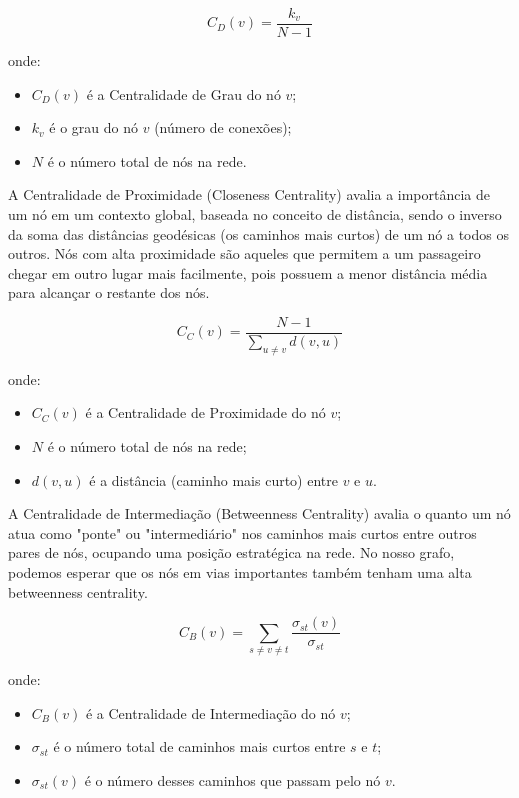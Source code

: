 \begin{equation*}
C_D(v) = \frac{k_v}{N - 1}
\end{equation*}

onde:
\begin{itemize}
    \item $C_D(v)$ é a Centralidade de Grau do nó $v$;
    \item $k_v$ é o grau do nó $v$ (número de conexões);
    \item $N$ é o número total de nós na rede.
\end{itemize}

A Centralidade de Proximidade (Closeness Centrality) avalia a importância de um nó em um contexto global, baseada no conceito de distância, sendo o inverso da soma das distâncias geodésicas (os caminhos mais curtos) de um nó a todos os outros. Nós com alta proximidade são aqueles que permitem a um passageiro chegar em outro lugar mais facilmente, pois possuem a menor distância média para alcançar o restante dos nós.

\begin{equation*}
C_C(v) = \frac{N - 1}{\sum_{u \neq v} d(v, u)}
\end{equation*}

onde:
\begin{itemize}
    \item $C_C(v)$ é a Centralidade de Proximidade do nó $v$;
    \item $N$ é o número total de nós na rede;
    \item $d(v, u)$ é a distância (caminho mais curto) entre $v$ e $u$.
\end{itemize}

A Centralidade de Intermediação (Betweenness Centrality) avalia o quanto um nó atua como "ponte" ou "intermediário" nos caminhos mais curtos entre outros pares de nós, ocupando uma posição estratégica na rede. No nosso grafo, podemos esperar que os nós em vias importantes também tenham uma alta betweenness centrality.

\begin{equation*}
C_B(v) = \sum_{s \neq v \neq t} \frac{\sigma_{st}(v)}{\sigma_{st}}
\end{equation*}

onde:
\begin{itemize}
    \item $C_B(v)$ é a Centralidade de Intermediação do nó $v$;
    \item $\sigma_{st}$ é o número total de caminhos mais curtos entre $s$ e $t$;
    \item $\sigma_{st}(v)$ é o número desses caminhos que passam pelo nó $v$.
\end{itemize}

